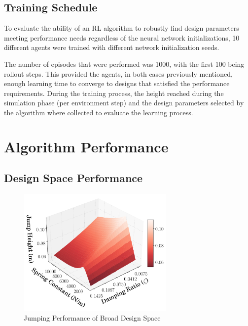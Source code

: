 \documentclass[10pt,twocolumn,letterpaper]{article}
\begin{document}
\subsection{Training Schedule}

To evaluate the ability of an RL algorithm to robustly find design parameters meeting performance needs regardless of the neural network initializations, 10 different agents were trained with different network initialization seeds.

The number of episodes that were performed was 1000, with the first 100 being rollout steps. This provided the agents, in both cases previously mentioned, enough learning time to converge to designs that satisfied the performance requirements. During the training process, the height reached during the simulation phase (per environment step) and the design parameters selected by the algorithm where collected to evaluate the learning process. 


\section{Algorithm Performance} 
\label{sec:results}

\subsection{Design Space Performance}
%
\begin{figure}[!t]
        \begin{center}
        \includegraphics[width = 3in]{figures/ppo_vs_td3/Design_3D_Plot_0.075_.pdf}  
        \caption{Jumping Performance of Broad Design Space}
        \label{fig:spring_zeta_height}
        \end{center}
\end{figure}
%
\end{document}
